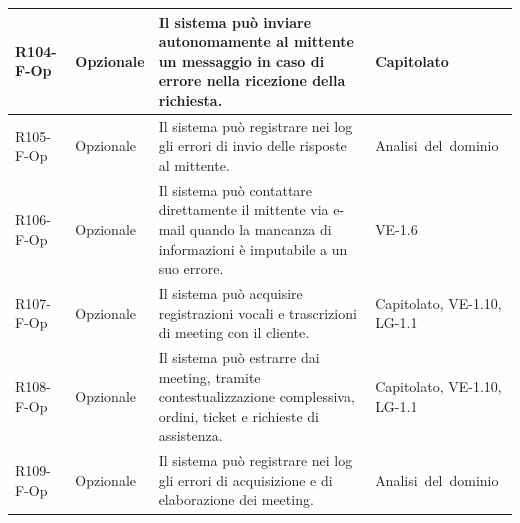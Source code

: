 {\begin{longtable}{|>{\raggedright\arraybackslash}p{1.8cm}|>{\raggedright\arraybackslash}p{2.3cm}|>{\raggedright\arraybackslash}p{6.6cm}|>{\raggedright\arraybackslash}p{3.1cm}|}
    \mbox{R104-F-Op} & Opzionale & Il sistema può inviare autonomamente al mittente un messaggio in caso di errore nella ricezione della richiesta. & \mbox{Capitolato} \\ \hline
    \mbox{R105-F-Op} & Opzionale & Il sistema può registrare nei log gli errori di invio delle risposte al mittente. & \mbox{Analisi del dominio} \\ \hline
    \mbox{R106-F-Op} & Opzionale & Il sistema può contattare direttamente il mittente via e-mail quando la mancanza di informazioni è imputabile a un suo errore. & \mbox{VE-1.6} \\ \hline
    \mbox{R107-F-Op} & Opzionale & Il sistema può acquisire registrazioni vocali e trascrizioni di meeting con il cliente. & \mbox{Capitolato}, \mbox{VE-1.10}, \mbox{LG-1.1} \\ \hline
    \mbox{R108-F-Op} & Opzionale & Il sistema può estrarre dai meeting, tramite contestualizzazione complessiva, ordini, ticket e richieste di assistenza. & \mbox{Capitolato}, \mbox{VE-1.10}, \mbox{LG-1.1} \\ \hline
    \mbox{R109-F-Op} & Opzionale & Il sistema può registrare nei log gli errori di acquisizione e di elaborazione dei meeting. & \mbox{Analisi del dominio} \\ \hline
    \end{longtable}
}